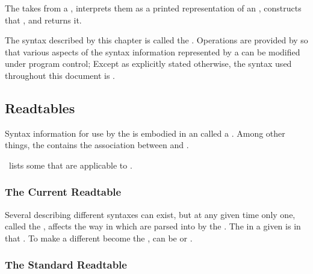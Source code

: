 

The  takes  from a , 
interprets them as a printed representation of an ,
constructs that , and returns it.

The syntax described by this chapter is called the .
Operations are provided by \commonlisp{} so that
various aspects of the syntax information represented by a  
can be modified under program control; 
Except as explicitly stated otherwise, 
the syntax used throughout this document is .

\subsection{Readtables}
\label{subsection-character-syntax-readtables}

Syntax information for use by the  is embodied in an
 called a .  Among other things, 
the  contains the association between  
and .

\Thenextfigure\ lists some  that are applicable to
.



\subsubsection{The Current Readtable}

Several  describing different syntaxes can exist,
but at any given time only one, called the , 
affects the way in which  are parsed 
into  by the .
The  in a given 
is  in that .
To make a different  become the ,
 can be  or .

\subsubsection{The Standard Readtable}

